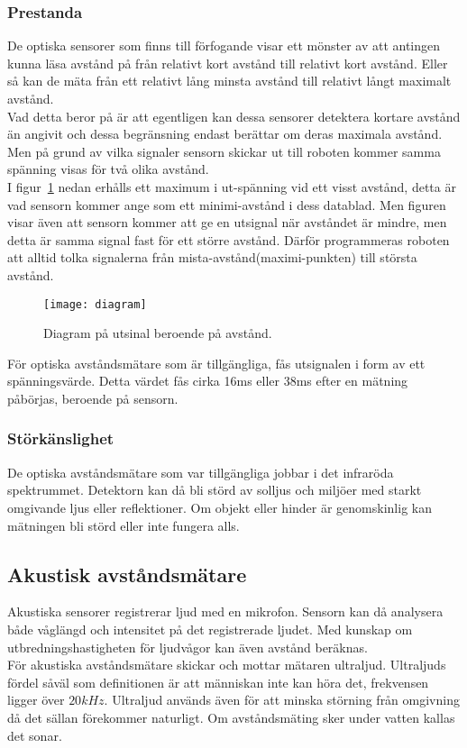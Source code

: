 \documentclass[11pt]{article}
\begin{document}
\begin{flushleft}
\subsubsection{Prestanda}
De optiska sensorer som finns till förfogande visar ett mönster av att antingen kunna läsa avstånd på från relativt kort avstånd till relativt kort avstånd. Eller så kan de mäta från ett relativt lång minsta avstånd till relativt långt maximalt avstånd. 
\\[0.1in]
Vad detta beror på är att egentligen kan dessa sensorer detektera kortare avstånd än angivit och dessa begränsning endast berättar om deras maximala avstånd. Men på grund av vilka signaler sensorn skickar ut till roboten kommer samma spänning visas för två olika avstånd.
\\[0.1in]
I figur~\ref{fig:diagram} nedan erhålls ett maximum i ut-spänning vid ett visst avstånd, detta är vad sensorn kommer ange som ett minimi-avstånd i dess datablad. Men figuren visar även att sensorn kommer att ge en utsignal när avståndet är mindre, men detta är samma signal fast för ett större avstånd. Därför programmeras roboten att alltid tolka signalerna från mista-avstånd(maximi-punkten) till största avstånd.
\\[0.1in]

\begin{figure}[H]
\centering
\texttt{[image: diagram]}
\caption{Diagram på utsinal beroende på avstånd. \autocite{diagram1}}
\label{fig:diagram}
\end{figure}

\pagebreak


För optiska avståndsmätare som är tillgängliga, fås utsignalen i form av ett spänningsvärde. Detta värdet fås cirka 16ms eller 38ms efter en mätning påbörjas, beroende på sensorn.

\subsubsection{Störkänslighet}
De optiska avståndsmätare som var tillgängliga jobbar i det infraröda spektrummet. Detektorn kan då bli störd av solljus och miljöer med starkt omgivande ljus eller reflektioner. Om objekt eller hinder är genomskinlig kan mätningen bli störd eller inte fungera alls.    


 \subsection{Akustisk avståndsmätare}
 Akustiska sensorer registrerar ljud med en mikrofon. Sensorn kan då analysera både våglängd och intensitet på det registrerade ljudet. Med kunskap om utbredningshastigheten för ljudvågor kan även avstånd beräknas.
 \\[0.1in]
 För akustiska avståndsmätare skickar och mottar mätaren ultraljud. Ultraljuds fördel såväl som definitionen är att människan inte kan höra det, frekvensen ligger över $20kHz$. Ultraljud används även för att minska störning från omgivning då det sällan förekommer naturligt. Om avståndsmäting sker under vatten kallas det sonar.      
 

\end{flushleft}
\end{document}
